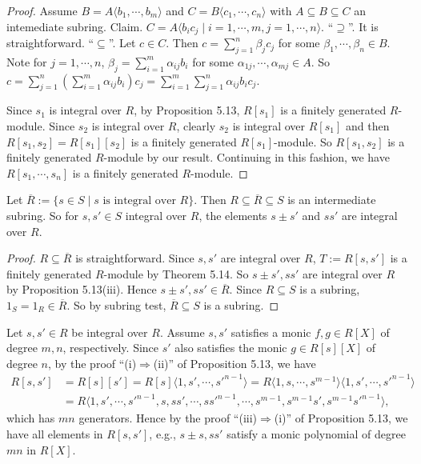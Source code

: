 \begin{proof}
    Assume $B = A\langle b_1,\cdots,b_m \rangle$ and $C = B\langle c_1,\cdots,c_n \rangle$ with $A \subseteq B \subseteq C$ an intemediate subring. Claim. $C = A \langle b_ic_j \mid i = 1,\cdots,m, j = 1,\cdots,n\rangle$. ``$\supseteq$''. It is straightforward. ``$\subseteq$''. Let $c \in C$. Then $c = \sum_{j=1}^{n} \beta_jc_j$ for some $\beta_1,\cdots,\beta_n \in B$. Note for $j = 1,\cdots,n$, $\beta_j = \sum_{i=1}^{m} \alpha_{ij}b_i$ for some $\alpha_{1j},\cdots,\alpha_{mj} \in A$. So $c = \sum_{j=1}^{n}(\sum_{i=1}^{m}\alpha_{ij}b_i)c_j = \sum_{i=1}^{m}\sum_{j=1}^{n} \alpha_{ij}b_ic_j$. \par
    Since $s_1$ is integral over $R$, by Proposition 5.13, $R[s_1]$ is a finitely generated $R$-module. Since $s_2$ is integral over $R$, clearly $s_2$ is integral over $R[s_1]$ and then $R[s_1,s_2] = R[s_1][s_2]$ is a finitely generated $R[s_1]$-module. So $R[s_1,s_2]$ is a finitely generated $R$-module by our result. Continuing in this fashion, we have $R[s_1,\cdots,s_n]$ is a finitely generated $R$-module.
\end{proof}

\begin{theorem}
    Let $\overbar{R} := \{s \in S \mid s \text{ is integral over }R\}$. Then $R \subseteq \overbar{R} \subseteq S$ is an intermediate subring. So for $s,s' \in S$ integral over $R$, the elements $s \pm s'$ and $ss'$ are integral over $R$.
\end{theorem}

\begin{proof}
    $R \subseteq \overbar{R}$ is straightforward. Since $s,s'$ are integral over $R$, $T := R[s,s']$ is a finitely generated $R$-module by Theorem 5.14. So $s \pm s',ss'$ are integral over $R$ by Proposition 5.13(iii). Hence $s \pm s', ss' \in \overbar{R}$. Since $R \subseteq S$ is a subring, $1_S = 1_R \in \overbar{R}$. So by subring test, $\overbar{R} \subseteq S$ is a subring. 
\end{proof}

\begin{note*}
    Let $s,s' \in R$ be integral over $R$. Assume $s,s'$ satisfies a monic $f,g \in R[X]$ of degree $m,n$, respectively. Since $s'$ also satisfies the monic $g \in R[s][X]$ of degree $n$, by the proof ``(i)$\Rightarrow$(ii)'' of Proposition 5.13, we have
    \begin{align*}
        R[s,s'] &= R[s][s'] = R[s]\langle 1,s',\cdots,s'^{n-1} \rangle = R\langle 1,s,\cdots,s^{m-1} \rangle \langle 1,s',\cdots,s'^{n-1} \rangle \\
        &= R\langle 1,s',\cdots,s'^{n-1},s,ss',\cdots,ss'^{n-1},\cdots,s^{m-1},s^{m-1}s',s^{m-1}s'^{n-1} \rangle,
    \end{align*}
    which has $mn$ generators. Hence by the proof ``(iii)$\Rightarrow$(i)'' of Proposition 5.13, we have all elements in $R[s,s']$, e.g., $s \pm s,ss'$ satisfy a monic polynomial of degree $mn$ in $R[X]$.
\end{note*}

